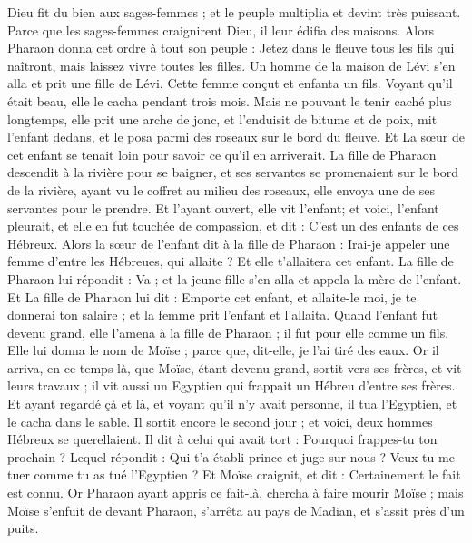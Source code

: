 \begin{multicols}{2}
Dieu fit du bien aux sages-femmes ; et le peuple multiplia et devint très puissant.
Parce que les sages-femmes craignirent Dieu, il leur édifia des maisons.
Alors Pharaon donna cet ordre à tout son peuple : Jetez dans le fleuve tous les fils qui naîtront, mais laissez vivre toutes les filles.
\VerseOne{}Un homme de la maison de Lévi s'en alla et prit une fille de Lévi.
Cette femme conçut et enfanta un fils. Voyant qu'il était beau, elle le cacha pendant trois mois.
Mais ne pouvant le tenir caché plus longtemps, elle prit une arche de jonc, et l'enduisit de bitume et de poix, mit l'enfant dedans, et le posa parmi des roseaux sur le bord du fleuve.
Et La sœur de cet enfant se tenait loin pour savoir ce qu'il en arriverait.
La fille de Pharaon descendit à la rivière pour se baigner, et ses servantes se promenaient sur le bord de la rivière, ayant vu le coffret au milieu des roseaux, elle envoya une de ses servantes pour le prendre.
Et l'ayant ouvert, elle  vit l'enfant; et voici, l'enfant pleurait, et elle en fut touchée de compassion, et dit : C'est un des enfants de ces Hébreux.
Alors la sœur de l'enfant dit à la fille de Pharaon : Irai-je appeler une femme d'entre les Hébreues, qui allaite ? Et elle t'allaitera cet enfant.
La fille de Pharaon lui répondit : Va ; et la jeune fille s'en alla et appela la mère de l'enfant.
Et La fille de Pharaon lui dit : Emporte cet enfant, et allaite-le moi, je te donnerai ton salaire ; et la femme prit l'enfant et l'allaita.
Quand l'enfant fut devenu grand, elle l'amena à la fille de Pharaon ; il fut pour elle comme un fils. Elle lui donna le nom de Moïse ; parce que, dit-elle, je l'ai tiré des eaux.
Or il arriva, en ce temps-là, que Moïse, étant devenu grand, sortit vers ses frères, et vit leurs travaux ; il vit aussi un Egyptien qui frappait un Hébreu d'entre ses frères.
Et ayant regardé çà et là, et voyant qu'il n'y avait personne, il tua l'Egyptien, et le cacha dans le sable.
Il sortit encore le second jour ; et voici, deux hommes Hébreux se querellaient. Il dit à celui qui avait tort : Pourquoi frappes-tu ton prochain ?
Lequel répondit : Qui t'a établi prince et juge sur nous ? Veux-tu me tuer comme tu as tué l'Egyptien ? Et Moïse craignit, et dit : Certainement le fait est connu.
Or Pharaon ayant appris ce fait-là, chercha à faire mourir Moïse ; mais Moïse s'enfuit de devant Pharaon, s'arrêta au pays de Madian, et s'assit près d'un puits.

\end{multicols}
